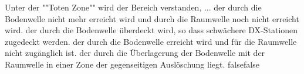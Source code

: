     {Unter der ""Toten Zone"" wird der Bereich verstanden, ...}
    {der durch die Bodenwelle nicht mehr erreicht wird und durch die Raumwelle noch nicht erreicht wird.}
    {der durch die Bodenwelle überdeckt wird, so dass schwächere DX-Stationen zugedeckt werden.}
    {der durch die Bodenwelle erreicht wird und für die Raumwelle nicht zugänglich ist.}
    {der durch die Überlagerung der Bodenwelle mit der Raumwelle in einer Zone der gegenseitigen Auslöschung liegt.}
    {false}{false}